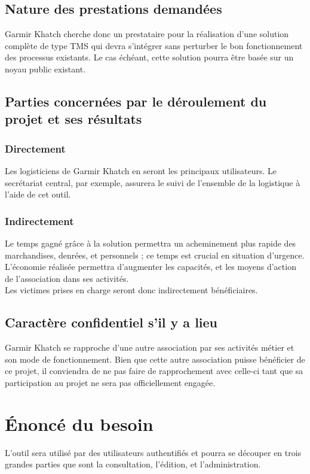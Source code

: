 \documentclass[11pt,fleqn]{book} %
\begin{document}
\subsection{Nature des prestations demandées}
Garmir Khatch cherche donc un prestataire pour la réalisation d'une solution complète de type TMS qui devra s'intégrer sans perturber le bon fonctionnement des processus existants. Le cas échéant, cette solution pourra être basée sur un noyau public existant.

\subsection{Parties concernées par le déroulement du projet et ses résultats}

\subsubsection{Directement}
Les logisticiens de Garmir Khatch en seront les principaux utilisateurs. Le secrétariat central, par exemple, assurera le suivi de l'ensemble de la logistique à l'aide de cet outil.

\subsubsection{Indirectement}
Le temps gagné grâce à la solution permettra un acheminement plus rapide des marchandises, denrées, et personnels ; ce temps est crucial en situation d'urgence. L'économie réalisée permettra d'augmenter les capacités, et les moyens d'action de l'association dans ses activités.
\\
Les victimes prises en charge seront donc indirectement bénéficiaires.

\subsection{Caractère confidentiel s'il y a lieu}
Garmir Khatch se rapproche d'une autre association par ses activités métier et son mode de fonctionnement. Bien que cette autre association puisse bénéficier de ce projet, il conviendra de ne pas faire de rapprochement avec celle-ci tant que sa participation au projet ne sera pas officiellement engagée.

\section{Énoncé du besoin}
L'outil sera utilisé par des utilisateurs authentifiés et pourra se découper en trois grandes parties que sont la consultation, l'édition, et l'administration.
\end{document}
